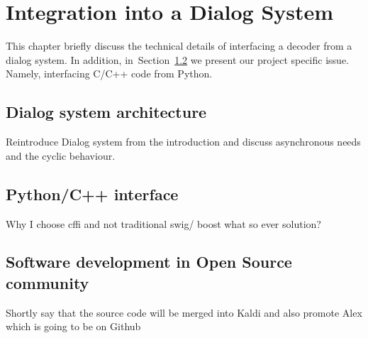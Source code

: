 \chapter{Integration into a Dialog System}
\label{cha:integration}
This chapter briefly discuss the technical details of interfacing
a decoder from a dialog system.
In addition, in~Section~\ref{sec:python_c_interface} we present our project specific issue.
Namely, interfacing C/C++ code from Python.

\section{Dialog system architecture} 
\label{sec:dialog_system_architecture}
Reintroduce Dialog system from the introduction and discuss asynchronous needs
and the cyclic behaviour.



\section{Python/C++ interface} 
\label{sec:python_c_interface}
Why I choose cffi and not traditional swig/ boost what so ever solution?


\section{Software development in Open Source community} 
\label{sec:software_development_in_open_source_community}
Shortly say that the source code will be merged into Kaldi 
and also promote Alex which is going to be on Github



